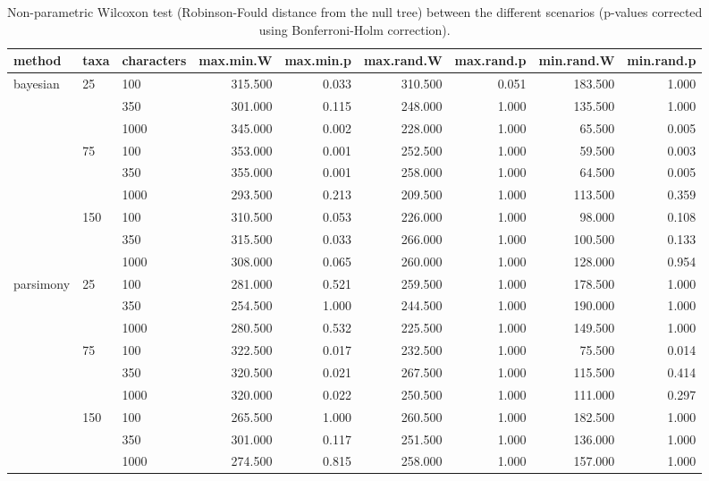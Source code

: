 \begin{table}[ht]
\centering
\begin{tabular}{lllrrrrrr}
  \hline
method & taxa & characters & max.min.W & max.min.p & max.rand.W & max.rand.p & min.rand.W & min.rand.p \\ 
  \hline
bayesian & 25 & 100 & 315.500 & 0.033 & 310.500 & 0.051 & 183.500 & 1.000 \\ 
   &  & 350 & 301.000 & 0.115 & 248.000 & 1.000 & 135.500 & 1.000 \\ 
   &  & 1000 & 345.000 & 0.002 & 228.000 & 1.000 & 65.500 & 0.005 \\ 
   & 75 & 100 & 353.000 & 0.001 & 252.500 & 1.000 & 59.500 & 0.003 \\ 
   &  & 350 & 355.000 & 0.001 & 258.000 & 1.000 & 64.500 & 0.005 \\ 
   &  & 1000 & 293.500 & 0.213 & 209.500 & 1.000 & 113.500 & 0.359 \\ 
   & 150 & 100 & 310.500 & 0.053 & 226.000 & 1.000 & 98.000 & 0.108 \\ 
   &  & 350 & 315.500 & 0.033 & 266.000 & 1.000 & 100.500 & 0.133 \\ 
   &  & 1000 & 308.000 & 0.065 & 260.000 & 1.000 & 128.000 & 0.954 \\ 
  parsimony & 25 & 100 & 281.000 & 0.521 & 259.500 & 1.000 & 178.500 & 1.000 \\ 
   &  & 350 & 254.500 & 1.000 & 244.500 & 1.000 & 190.000 & 1.000 \\ 
   &  & 1000 & 280.500 & 0.532 & 225.500 & 1.000 & 149.500 & 1.000 \\ 
   & 75 & 100 & 322.500 & 0.017 & 232.500 & 1.000 & 75.500 & 0.014 \\ 
   &  & 350 & 320.500 & 0.021 & 267.500 & 1.000 & 115.500 & 0.414 \\ 
   &  & 1000 & 320.000 & 0.022 & 250.500 & 1.000 & 111.000 & 0.297 \\ 
   & 150 & 100 & 265.500 & 1.000 & 260.500 & 1.000 & 182.500 & 1.000 \\ 
   &  & 350 & 301.000 & 0.117 & 251.500 & 1.000 & 136.000 & 1.000 \\ 
   &  & 1000 & 274.500 & 0.815 & 258.000 & 1.000 & 157.000 & 1.000 \\ 
   \hline
\end{tabular}
\caption{Non-parametric Wilcoxon test (Robinson-Fould distance from the null tree) between the different scenarios (p-values corrected using Bonferroni-Holm correction).} 
\label{Full_Tab_BCRFnull}
\end{table}
